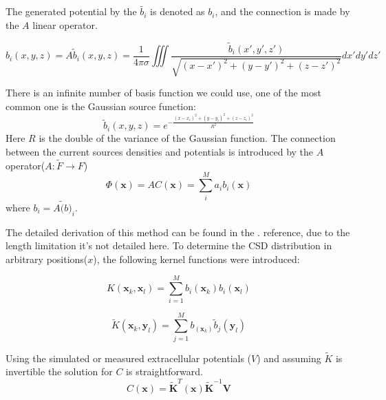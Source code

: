 \documentclass[12pt,a4paper]{article}
\begin{document}
The generated potential by the $\tilde{b_i}$ is denoted as  $b_i$, and the connection is made by the $A$ linear operator.

\begin{equation}
\label{eq:bfun}
b_i (x,y,z)= A \tilde{b}_i (x,y,z)= \frac{1}{4 \pi \sigma} \iiint 
\frac{ \tilde{b}_i (x',y',z')}{\sqrt{(x-x')^2+(y-y')^2+(z-z')^2}} dx' dy' dz'
\end{equation}

There is an infinite number of basis function we could use, one of the most common one is the Gaussian source function:
\begin{equation}
\label{eq:basisfun}
\tilde{b}_i (x,y,z) = e^{- \frac{(x-x_i)^2+(y-y_i)^2+(z-z_i)^2}{R^2}}
\end{equation}
Here $R$ is the double of the variance of the Gaussian function. The connection between the current sources densities and potentials is introduced by the $A$ operator($A: \tilde{F}\rightarrow F$)
\begin{equation}
\Phi(\textbf{x})= A C(\textbf{x}) =  \sum_{i}^M a_i b_i (\textbf{x})
\end{equation}
 where $b_i = A \tilde(b)_i$.
 
 
 
 
 
The detailed derivation of this method can be found in the \cite{DanielW}. reference, due to the length limitation it's not detailed here.
To determine the CSD distribution in arbitrary positions($x$), the following kernel functions were introduced:

\begin{equation}
K(\textbf{x}_k,\textbf{x}_l)= \sum_{i=1}^M b_i (\textbf{x}_k) b_i (\textbf{x}_l)
\end{equation} 
 
\begin{equation}
\tilde{K}(\textbf{x}_k,\textbf{y}_l)= \sum_{j=1}^M b_ (\textbf{x}_k) \tilde{b}_j (\textbf{y}_l) 
\end{equation} 
 
Using the simulated or measured extracellular potentials ($V$) and assuming $\tilde{K}$ is invertible the solution for $C$ is straightforward.
 \begin{equation}
 C(\textbf{x})=\tilde{\textbf{K}}^T(\textbf{x})  
 \tilde{\textbf{K}}^{-1} \textbf{V}
 \end{equation}
\end{document}
